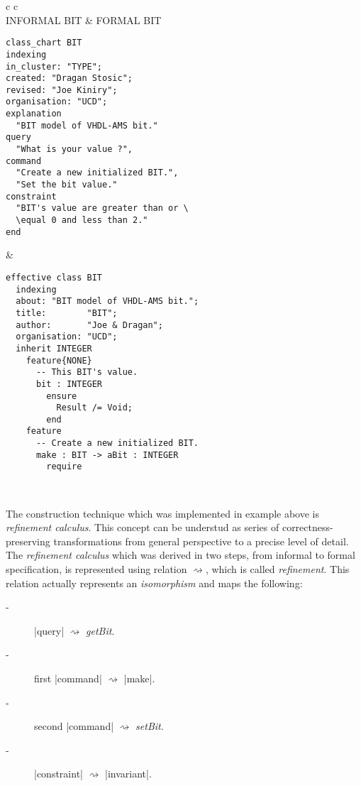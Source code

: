 \begin{center}
\begin{tabular}{ c  c }
\\ 
INFORMAL BIT & FORMAL BIT \\ 
\begin{minipage}[l]{6.4cm} 
\begin{lstlisting}[language=Bon]
class_chart BIT
indexing
in_cluster: "TYPE";
created: "Dragan Stosic";
revised: "Joe Kiniry";
organisation: "UCD";
explanation
  "BIT model of VHDL-AMS bit."
query
  "What is your value ?",
command
  "Create a new initialized BIT.",
  "Set the bit value."
constraint
  "BIT's value are greater than or \
  \equal 0 and less than 2."
end
\end{lstlisting}

\end{minipage}  
&
\begin{minipage}[l]{6.6cm}
\begin{lstlisting}[language=Bon]
effective class BIT
  indexing
  about: "BIT model of VHDL-AMS bit.";
  title:        "BIT";
  author:       "Joe & Dragan";
  organisation: "UCD"; 
  inherit INTEGER
    feature{NONE}
      -- This BIT's value.
      bit : INTEGER 
        ensure
          Result /= Void;
        end
    feature
      -- Create a new initialized BIT.
      make : BIT -> aBit : INTEGER
        require   
\end{lstlisting}
\end{minipage}\\
\begin{minipage}[l]{6.4cm}
The construction technique which was implemented in example above is
\emph{refinement calculus}. 
This concept  can be understud as series of correctness-preserving 
transformations from general perspective to a precise level of detail.\\
The \emph{refinement calculus} which was derived in two steps, 
from informal to formal specification, is represented using relation 
$\rightsquigarrow$, which is called \emph{refinement}.
This relation actually represents an \emph{isomorphism} and maps the following:
\begin{description}
\item[-] \lstinlinenb|query| $\rightsquigarrow$ \emph{getBit}.
\item[-] first \lstinlinenb|command| $\rightsquigarrow$ \lstinlinenb|make|.
\item[-] second \lstinlinenb|command| $\rightsquigarrow$ \emph{setBit}.
\item[-] \lstinlinenb|constraint| $\rightsquigarrow$ \lstinlinenb|invariant|.

\end{description}
\end{minipage}
\end{tabular}
\end{center}
